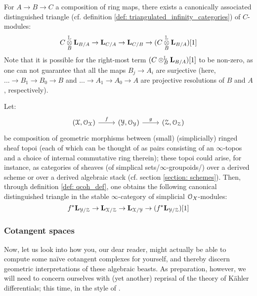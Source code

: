                 \begin{proposition} \label{prop: canonical_exact_sequence_of_cotangent_complexes}
                    For $A \to B \to C$ a composition of ring maps, there exists a canonically associated distinguished triangle (cf. definition \ref{def: triangulated_infinity_categories}) of $C$-modules:
                        $$C \tensor_B^{\L} \bfL_{B/A} \to \bfL_{C/A} \to \bfL_{C/B} \to (C \tensor_B^{\L} \bfL_{B/A})[1]$$
                    Note that it is possible for the right-most term $(C \tensor_B^{\L} \bfL_{B/A})[1]$ to be non-zero, as one can not guarantee that all the maps $B_j \to A_i$ are surjective (here, $... \to B_1 \to B_0 \to B$ and $... \to A_1 \to A_0 \to A$ are projective resolutions of $B$ and $A$, respectively). 
                \end{proposition}
                \begin{corollary} \label{coro: canonical_exact_sequence_of_cotangent_complexes_of_ringed_topoi}
                    Let:
                        $$
                            \begin{tikzcd}
                            	{(\calX, \calO_{\calX})} & {(\calY, \calO_{\calY})} & {(\calZ, \calO_{\calZ})}
                            	\arrow["f", from=1-1, to=1-2]
                            	\arrow["g", from=1-2, to=1-3]
                            \end{tikzcd}
                        $$
                    be composition of geometric morphisms between (small) (simplicially) ringed sheaf topoi (each of which can be thought of as pairs consisting of an $\infty$-topos and a choice of internal commutative ring therein); these topoi could arise, for instance, as categories of sheaves (of simplical sets/$\infty$-groupoids/) over a derived scheme or over a derived algebraic stack (cf. section \ref{section: schemes}). Then, through definition \ref{def: qcoh_def}, one obtains the following canonical distinguished triangle in the stable $\infty$-category of simplicial $\mathcal{O}_X$-modules:
                        $$f^*\mathbf{L}_{\mathcal{Y}/\mathcal{Z}} \to \mathbf{L}_{\mathcal{X}/\mathcal{Z}} \to \mathbf{L}_{\mathcal{X}/\mathcal{Y}} \to (f^*\mathbf{L}_{\mathcal{Y}/\mathcal{Z}})[1]$$
                \end{corollary}
                
            \subsubsection{Cotangent spaces} \label{subsubsection: cotangent_spaces}
                Now, let us look into how you, our dear reader, might actually be able to compute some na\"ive cotangent complexes for yourself, and thereby discern geometric interpretations of these algebraic beasts. As preparation, however, we will need to concern ourselves with (yet another) reprisal of the theory of K\"ahler differentials; this time, in the style of \cite[Sections 7.3 and 7.4]{HA}.
                
